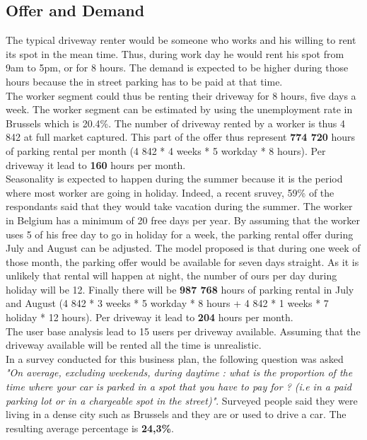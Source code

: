 \documentclass[12pt,a4paper,oneside]{book}
\begin{document}
\subsection{Offer and Demand}

The typical driveway renter would be someone who works and his willing to rent its spot in the mean time. Thus, during work day he would rent his spot from 9am to 5pm, or for 8 hours. The demand is expected to be higher during those hours because the in street parking has to be paid at that time.\\

The worker segment could thus be renting their driveway for 8 hours, five days a week. The worker segment can be estimated by using the unemployment rate in Brussels which is 20.4\%.\cite{unemploybx} The number of driveway rented by a worker is thus 4 842 at full market captured. This part of the offer thus represent \textbf{774 720} hours of parking rental per month (4 842 * 4 weeks * 5 workday * 8 hours). Per driveway it lead to \textbf{160} hours per month.\\

Seasonality is expected to happen during the summer because it is the period where most worker are going in holiday. Indeed, a recent sruvey, 59\% of the respondants said that they would take vacation during the summer.\cite{hdws} The worker in Belgium has a minimum of 20 free days per year.\cite{hdbe} By assuming that the worker uses 5 of his free day to go in holiday for a week, the parking rental offer during July and August can be adjusted.\cite{hdbe} The model proposed is that during one week of those month, the parking offer would be available for seven days straight. As it is unlikely that rental will happen at night, the number of ours per day during holiday will be 12. Finally there will be \textbf{987 768} hours of parking rental in July and August (4 842 * 3 weeks * 5 workday * 8 hours + 4 842 * 1 weeks * 7 holiday * 12 hours). Per driveway it lead to \textbf{204} hours per month.\\

The user base analysis lead to 15 users per driveway available. Assuming that the driveway available will be rented all the time is unrealistic.\\

In a survey conducted for this business plan, the following question was asked \textit{"On average, excluding weekends, during daytime : what is the proportion of the time where your car is parked in a spot that you have to pay for ? (i.e in a paid parking lot or in a chargeable spot in the street)"}. Surveyed people said they were living in a dense city such as Brussels and they are or used to drive a car. The resulting average percentage is \textbf{24,3\%}.\\
\end{document}
